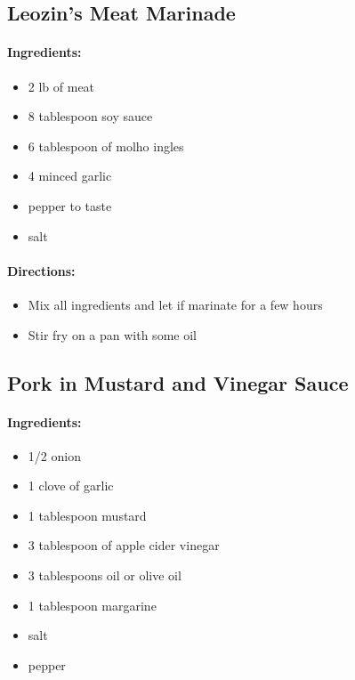\documentclass{article}
\begin{document}
\subsection{Leozin’s Meat Marinade}

\paragraph{Ingredients:}
\begin{itemize}
    \item 2 lb of meat
    \item 8 tablespoon soy sauce
    \item 6 tablespoon of molho ingles
    \item 4 minced garlic
    \item pepper to taste
    \item salt
\end{itemize}

\paragraph{Directions:}
\begin{itemize}
    \item Mix all ingredients and let if marinate for a few hours
    \item Stir fry on a pan with some oil
\end{itemize}

\subsection{Pork in Mustard and Vinegar Sauce}

\paragraph{Ingredients:}
\begin{itemize}
    \item 1/2 onion
    \item 1 clove of garlic
    \item 1 tablespoon mustard
    \item 3 tablespoon of apple cider vinegar
    \item 3 tablespoons oil or olive oil
    \item 1 tablespoon margarine
    \item salt
    \item pepper
\end{itemize}
\end{document}
